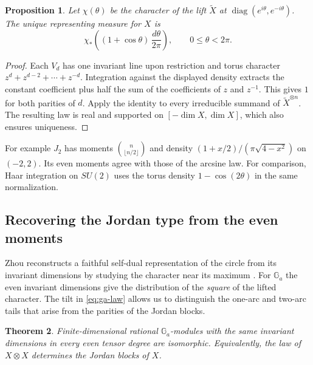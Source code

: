 \documentclass[11pt,reqno]{amsart}
\newtheorem{theorem}{Theorem}[section]
\newtheorem{proposition}[theorem]{Proposition}
\theoremstyle{definition}
\newcommand{\Ga}{\mathbb G_a}
\begin{document}
\begin{proposition}\label{prop:additive-law}
Let $\chi(\theta)$ be the character of the lift $\widetilde X$ at
$\operatorname{diag}(e^{i\theta},e^{-i\theta})$. The unique representing
measure for $X$ is
\begin{equation}\label{eq:ga-law}
   \chi_*\!\left((1+\cos\theta)\,\frac{d\theta}{2\pi}\right),
   \qquad 0\le\theta<2\pi.
\end{equation}
\end{proposition}
\begin{proof}
Each $V_d$ has one invariant line upon restriction and torus character $z^d+z^{d-2}+\cdots+z^{-d}$.
Integration against the displayed density extracts the constant
coefficient plus half the sum of the coefficients of $z$ and $z^{-1}$.
This gives $1$ for both parities of $d$. Apply the identity to every
irreducible summand of $\widetilde X^{\otimes n}$. The resulting law is
real and supported on $[-\dim X,\dim X]$, which also ensures uniqueness.
\end{proof}

For example $J_2$ has moments $\binom n{\lfloor n/2\rfloor}$
\cite[Proposition~5.3]{DG} and density
$(1+x/2)/(\pi\sqrt{4-x^2})$ on $(-2,2)$. Its even moments agree with
those of the arcsine law. For comparison, Haar integration on $SU(2)$
uses the torus density $1-\cos(2\theta)$ in the same normalization.

\subsection{Recovering the Jordan type from the even moments}
Zhou reconstructs a faithful self-dual representation of the circle from its invariant dimensions by studying the character near its maximum \cite[Theorem~1.1 and Corollary~1.2]{Zhou}. For $\Ga$ the even invariant dimensions give the distribution of the \emph{square} of the lifted character. The tilt in \eqref{eq:ga-law} allows us to distinguish the one-arc and two-arc tails that arise from the parities of the Jordan blocks.

\begin{theorem}\label{thm:reconstruction}
Finite-dimensional rational $\Ga$-modules with the same invariant dimensions in every even tensor degree are isomorphic. Equivalently, the law of $X\otimes X$ determines the Jordan blocks of $X$.
\end{theorem}
\end{document}
